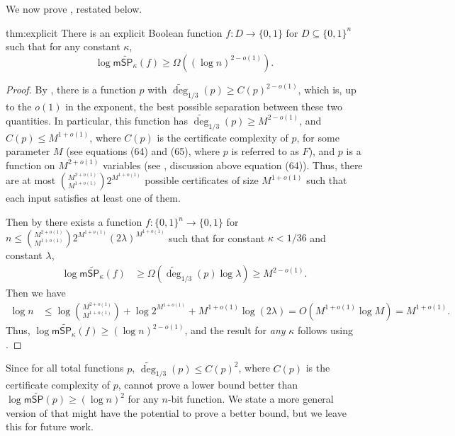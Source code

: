 \documentclass{toc}
\begin{document}
We now prove , restated below. %
\begin{reptheorem}{thm:explicit}
There is an explicit Boolean function $f:D\rightarrow\{0,1\}$ for $D\subseteq \{0,1\}^n$ such that for any constant $\kappa$,
$$\log\mathsf{m}\widetilde{\mathsf{SP}}_{\kappa}(f)\geq {\Omega}((\log n)^{2-o(1)}).$$
\end{reptheorem}
\begin{proof}
By \cite[Theorem 38]{BT17}, there is a function $p$ with $\widetilde{\deg}_{1/3}(p)\geq C(p)^{2-o(1)}$, which is, up to the $o(1)$ in the exponent, the best possible separation between these two quantities. In particular, this function has $\widetilde{\deg}_{1/3}(p)\geq M^{2-o(1)}$, and $C(p)\leq M^{1+o(1)}$, where $C(p)$ is the certificate complexity of $p$, for some parameter $M$ (see \cite{BT17} equations (64) and (65), where $p$ is referred to as $F$), and $p$ is a function on $M^{2+o(1)}$ variables (see \cite{BT17}, discussion above equation (64)). Thus, there are at most $\binom{M^{2+o(1)}}{M^{1+o(1)}}2^{M^{1+o(1)}}$ possible certificates of size $M^{1+o(1)}$ such that each input satisfies at least one of them. 

\noindent  %
Then by  there exists a function $f:\{0,1\}^n\rightarrow\{0,1\}$ for $n\leq \binom{M^{2+o(1)}}{M^{1+o(1)}}2^{M^{1+o(1)}}(2\lambda)^{M^{1+o(1)}}$ such that for constant $\kappa < 1/36$ and constant 
$\lambda$,   %
\begin{align*}
\log\mathsf{m}\widetilde{\mathsf{SP}}_{\kappa}(f) &\geq \Omega(\widetilde{\deg}_{1/3}(p)\log\lambda)\geq M^{2-o(1)}.
\end{align*}
Then we have %
\begin{align*}
\log n &\leq \log\binom{M^{2+o(1)}}{M^{1+o(1)}}+\log 2^{M^{1+o(1)}}+M^{1+o(1)}\log(2\lambda)=O(M^{1+o(1)}\log M)=M^{1+o(1)}.
\end{align*}
Thus, $\log\mathsf{m}\widetilde{\mathsf{SP}}_{\kappa}(f)\geq (\log n)^{2-o(1)}$, and the result for \emph{any} $\kappa$ follows using .
\end{proof}

Since for all total functions $p$, $\widetilde{\deg}_{1/3}(p)\leq C(p)^2$, where $C(p)$ is the certificate complexity of $p$, 
%
cannot  %
prove a lower bound better than $\log \mathsf{m}\widetilde{\mathsf{SP}}(p)\geq (\log n)^2$ for any $n$-bit function. We state a more general version of  that might have the potential to prove a better bound, but we leave this %
%
for %
future work. 
\end{document}
